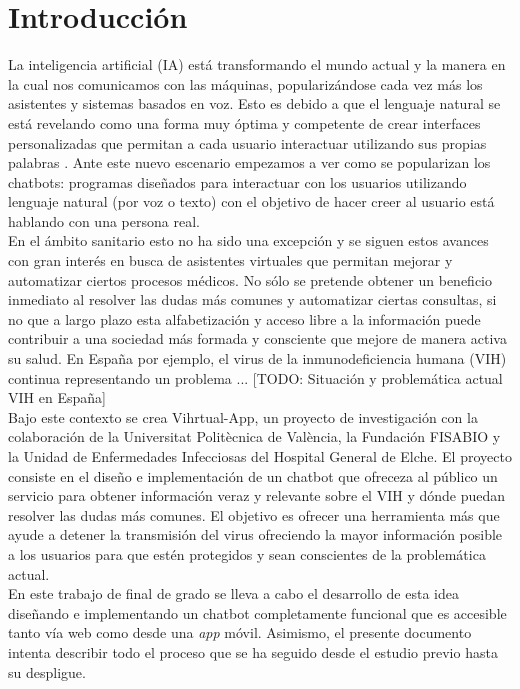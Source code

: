 \section{Introducción}
La inteligencia artificial (IA) está transformando el mundo actual y la manera en la cual nos comunicamos con las máquinas, popularizándose cada vez más los asistentes y sistemas basados en voz. Esto es debido a que el lenguaje natural se está revelando como una forma muy óptima y competente de crear interfaces personalizadas que permitan a cada usuario interactuar utilizando sus propias palabras \cite{naturalDialogue} . Ante este nuevo escenario empezamos a ver como se popularizan los chatbots: programas diseñados para interactuar con los usuarios utilizando lenguaje natural (por voz o texto) con el objetivo de hacer creer al usuario está hablando con una persona real. \\

En el ámbito sanitario esto no ha sido una excepción y se siguen estos avances con gran interés en busca de asistentes virtuales que permitan mejorar y automatizar ciertos procesos médicos\cite{healthAgents}. No sólo se pretende obtener un beneficio inmediato al resolver las dudas más comunes y automatizar ciertas consultas, si no que a largo plazo esta alfabetización y acceso libre a la información puede contribuir a una sociedad más formada y consciente que mejore de manera activa su salud. En España por ejemplo, el virus de la inmunodeficiencia humana (VIH) continua representando un problema ... [TODO: Situación y problemática actual VIH en España]\\

Bajo este contexto se crea Vihrtual-App, un proyecto de investigación con la colaboración de la Universitat Politècnica de València, la Fundación FISABIO y la Unidad de Enfermedades Infecciosas del Hospital General de Elche. El proyecto consiste en el diseño e implementación de un chatbot que ofreceza al público un servicio para obtener información veraz y relevante sobre el VIH y dónde puedan resolver las dudas más comunes. El objetivo es ofrecer una herramienta más que ayude a detener la transmisión del virus ofreciendo la mayor información posible a los usuarios para que estén protegidos y sean conscientes de la problemática actual.\\ %

En este trabajo de final de grado se lleva a cabo el desarrollo de esta idea diseñando e implementando un chatbot completamente funcional que es accesible tanto vía web como desde una \textit{app} móvil. Asimismo, el presente documento intenta describir todo el proceso que se ha seguido desde el estudio previo hasta su despligue.


